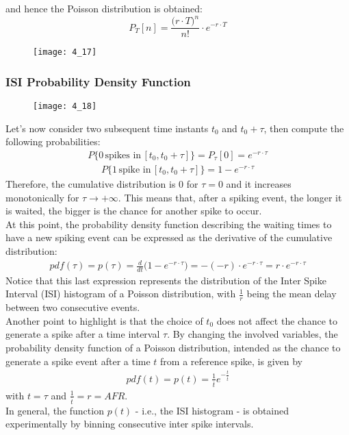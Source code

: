 and hence the Poisson distribution is obtained:
\begin{equation*}
    P_T[n]=\frac{\bigl(r\cdot T\bigr)^n}{n!}\cdot{e^{-r\cdot T}}
\end{equation*}
\begin{figure}[H]
    \texttt{[image: 4\_17]}
    \centering
\end{figure}
\subsubsection{ISI Probability Density Function}
\begin{figure}[H]
    \texttt{[image: 4\_18]}
    \centering
\end{figure}
Let's now consider two subsequent time instants \(t_0\) and \(t_0+\tau\), then compute
the following probabilities:
\begin{align*}
    P\{0\,\text{spikes in}\,[t_0,t_0+\tau]\} = P_{\tau}[0] = e^{-r\cdot\tau}
\end{align*}
\begin{align*}
    P\{1\,\text{spike in}\,[t_0,t_0+\tau]\}
    = 1-e^{-r\cdot\tau}
\end{align*}
Therefore, the cumulative distribution is 0 for \(\tau=0\) and it increases
monotonically for \(\tau\to{+\infty}\). This means that, after a spiking event,
the longer it is waited, the bigger is the chance for another spike to occur.\\
At this point, the probability density function describing the waiting times to
have a new spiking event can be expressed as the derivative of the cumulative
distribution:
\begin{align*}
    pdf(\tau)
    =p(\tau)
    =\frac{d}{dt}\bigl(1-e^{-r\cdot\tau}\bigr)
    =-(-r)\cdot{e^{-r\cdot\tau}}
    =r\cdot{e^{-r\cdot\tau}}
\end{align*}
Notice that this last expression represents the distribution of the Inter Spike
Interval (ISI) histogram of a Poisson distribution, with \(\frac{1}{r}\) being
the mean delay between two consecutive events.\\
Another point to highlight is that the choice of \(t_0\) does not affect the chance
to generate a spike after a time interval \(\tau\).
By changing the involved variables, the probability density function of a
Poisson distribution, intended as the chance to generate a spike event after a time
\(t\) from a reference spike, is given by
\begin{align*}
    pdf(t)
    =p(t)
    =\frac{1}{\overline{t}}e^{-\frac{t}{\overline{t}}}
\end{align*}
with \(t=\tau\) and \(\frac{1}{\overline{t}}=r=AFR\).\\
In general, the function \(p(t)\) - i.e., the ISI histogram - is obtained
experimentally by binning consecutive inter spike intervals.
